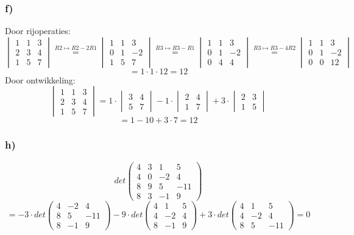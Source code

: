\documentclass[10pt,a4paper]{article}
\begin{document}
\subsubsection*{f)}
Door rijoperaties:
$$
\begin{vmatrix}
1 & 1 & 3\\
2 & 3 & 4\\
1 & 5 & 7
\end{vmatrix}
\overset{R2 \longmapsto R2-2R1}{=}
\begin{vmatrix}
1 & 1 & 3\\
0 & 1 & -2\\
1 & 5 & 7
\end{vmatrix}
\overset{R3 \longmapsto R3-R1}{=}
\begin{vmatrix}
1 & 1 & 3\\
0 & 1 & -2\\
0 & 4 & 4
\end{vmatrix}
\overset{R3 \longmapsto R3-4R2}{=}
\begin{vmatrix}
1 & 1 & 3\\
0 & 1 & -2\\
0 & 0 & 12
\end{vmatrix}
$$
$$ = 1\cdot 1 \cdot 12 = 12$$
Door ontwikkeling:
$$
\begin{vmatrix}
1 & 1 & 3\\
2 & 3 & 4\\
1 & 5 & 7
\end{vmatrix}
= 1 \cdot
\begin{vmatrix}
3 & 4\\
5 & 7
\end{vmatrix}
- 1 \cdot 
\begin{vmatrix}
2 & 4\\
1 & 7
\end{vmatrix}
+3\cdot
\begin{vmatrix}
2 & 3\\
1 & 5
\end{vmatrix}
$$
$$
= 1 - 10 + 3\cdot 7 = 12
$$

\subsubsection*{h)}
\[ det
\begin{pmatrix}
4 & 3 & 1 & 5\\
4 & 0 & -2 & 4\\
8 & 9 & 5 & -11\\
8 & 3 & -1 & 9
\end{pmatrix}
\]
\[ = -3 \cdot det
\begin{pmatrix}
4 & -2 & 4\\
8 & 5 & -11\\
8 & -1 & 9
\end{pmatrix}
-9 \cdot det 
\begin{pmatrix}
4 & 1 & 5\\
4 & -2 & 4\\
8 & -1 & 9
\end{pmatrix}
+3 \cdot det
\begin{pmatrix}
4 & 1 & 5\\
4 & -2 & 4\\
8 & 5 & -11
\end{pmatrix}
= 0
\]
\end{document}
